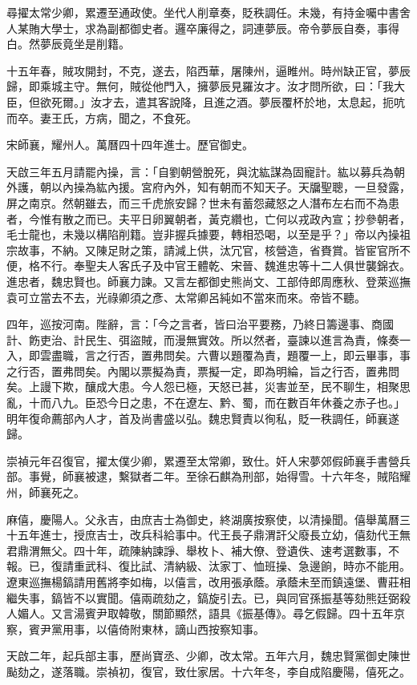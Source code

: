 \begin{pinyinscope}
尋擢太常少卿，累遷至通政使。坐代人削章奏，貶秩調任。未幾，有持金囑中書舍人某賄大學士，求為副都御史者。邏卒廉得之，詞連夢辰。帝令夢辰自奏，事得白。然夢辰竟坐是削籍。

十五年春，賊攻開封，不克，遂去，陷西華，屠陳州，逼睢州。時州缺正官，夢辰歸，即乘城主守。無何，賊從他門入，擁夢辰見羅汝才。汝才問所欲，曰：「我大臣，但欲死爾。」汝才去，遣其客說降，且進之酒。夢辰覆杯於地，太息起，扼吭而卒。妻王氏，方病，聞之，不食死。

宋師襄，耀州人。萬曆四十四年進士。歷官御史。

天啟三年五月請罷內操，言：「自劉朝營脫死，與沈紘謀為固寵計。紘以募兵為朝外護，朝以內操為紘內援。宮府內外，知有朝而不知天子。天牖聖聰，一旦發露，屏之南京。然朝雖去，而三千虎旅安歸？世未有蓄怨藏怒之人潛布左右而不為患者，今惟有散之而已。夫平日卵翼朝者，黃克纘也，亡何以戎政內宣；抄參朝者，毛士龍也，未幾以構陷削籍。豈非握兵據要，轉相恐喝，以至是乎？」帝以內操祖宗故事，不納。又陳足財之策，請減上供，汰冗官，核營造，省賚賞。皆宦官所不便，格不行。奉聖夫人客氏子及中官王體乾、宋晉、魏進忠等十二人俱世襲錦衣。進忠者，魏忠賢也。師襄力諫。又言左都御史熊尚文、工部侍郎周應秋、登萊巡撫袁可立當去不去，光祿卿須之彥、太常卿呂純如不當來而來。帝皆不聽。

四年，巡按河南。陛辭，言：「今之言者，皆曰治平要務，乃終日籌邊事、商國計、飭吏治、計民生、弭盜賊，而漫無實效。所以然者，臺諫以進言為責，條奏一入，即雲盡職，言之行否，置弗問矣。六曹以題覆為責，題覆一上，即云畢事，事之行否，置弗問矣。內閣以票擬為責，票擬一定，即為明綸，旨之行否，置弗問矣。上謾下欺，釀成大患。今人怨已極，天怒已甚，災害並至，民不聊生，相聚思亂，十而八九。臣恐今日之患，不在遼左、黔、蜀，而在數百年休養之赤子也。」明年復命薦部內人才，首及尚書盛以弘。魏忠賢責以徇私，貶一秩調任，師襄遂歸。

崇禎元年召復官，擢太僕少卿，累遷至太常卿，致仕。奸人宋夢郊假師襄手書營兵部。事覺，師襄被逮，繫獄者二年。至徐石麒為刑部，始得雪。十六年冬，賊陷耀州，師襄死之。

麻僖，慶陽人。父永吉，由庶吉士為御史，終湖廣按察使，以清操聞。僖舉萬曆三十五年進士，授庶吉士，改兵科給事中。代王長子鼎渭訐父廢長立幼，僖劾代王無君鼎渭無父。四十年，疏陳納諫諍、舉枚卜、補大僚、登遺佚、速考選數事，不報。已，復請重武科、復比試、清納級、汰家丁、恤班操、急邊餉，時亦不能用。遼東巡撫楊鎬請用舊將李如梅，以僖言，改用張承蔭。承蔭未至而鎮遠堡、曹莊相繼失事，鎬皆不以實聞。僖兩疏劾之，鎬旋引去。已，與同官孫振基等劾熊廷弼殺人媚人。又言湯賓尹取韓敬，關節顯然，語具《振基傳》。尋乞假歸。四十五年京察，賓尹黨用事，以僖倚附東林，謫山西按察知事。

天啟二年，起兵部主事，歷尚寶丞、少卿，改太常。五年六月，魏忠賢黨御史陳世颭劾之，遂落職。崇禎初，復官，致仕家居。十六年冬，李自成陷慶陽，僖死之。


\end{pinyinscope}
